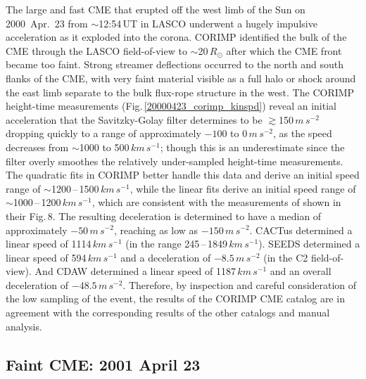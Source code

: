 \documentclass[referee,a4paper,12pt,traditabstract]{swsc}
\begin{document}
The large and fast CME that erupted off the west limb of the Sun on 2000~Apr.~23 from $\sim$12:54\,UT in LASCO underwent a hugely impulsive acceleration as it exploded into the corona. CORIMP identified the bulk of the CME through the LASCO field-of-view to $\sim$20\,$R_\odot$ after which the CME front became too faint. Strong streamer deflections occurred to the north and south flanks of the CME, with very faint material visible as a full halo or shock around the east limb separate to the bulk flux-rope structure in the west. The CORIMP height-time measurements (Fig.\,\ref{20000423_corimp_kinspd}) reveal an initial acceleration that the Savitzky-Golay filter determines to be $\gtrsim$150\,$m\,s^{-2}$ dropping quickly to a range of approximately $-100$ to 0\,$m\,s^{-2}$, as the speed decreases from $\sim$1000 to 500\,$km\,s^{-1}$; though this is an underestimate since the filter overly smoothes the relatively under-sampled height-time measurements. The quadratic fits in CORIMP better handle this data and derive an initial speed range of $\sim$1200\,--\,1500\,$km\,s^{-1}$, while the linear fits derive an initial speed range of $\sim$1000\,--\,1200\,$km\,s^{-1}$, which are consistent with the measurements of \cite{2009A&A...495..325B} shown in their Fig.\,8. The resulting deceleration is determined to have a median of approximately $-50\,m\,s^{-2}$, reaching as low as $-150\,m\,s^{-2}$. CACTus determined a linear speed of 1114$\,km\,s^{-1}$ (in the range 245\,--\,1849\,$km\,s^{-1}$). SEEDS determined a linear speed of 594\,$km\,s^{-1}$ and a deceleration of $-8.5\,m\,s^{-2}$ (in the C2 field-of-view). And CDAW determined a linear speed of 1187$\,km\,s^{-1}$ and an overall deceleration of $-48.5\,m\,s^{-2}$. Therefore, by inspection and careful consideration of the low sampling of the event, the results of the CORIMP CME catalog are in agreement with the corresponding results of the other catalogs and manual analysis.


\subsection{Faint CME: 2001 April 23}
\label{sect_20010423}
\end{document}
